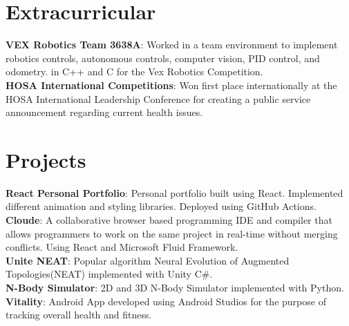 \documentclass[letterpaper,10pt]{article}
\begin{document}
\section{Extracurricular}
 \begin{itemize}[leftmargin=0.15in, label={}]
    \small{\item{
     \textbf{VEX Robotics Team 3638A}{: Worked in a team environment to implement robotics controls,
autonomous controls, computer vision, PID control, and odometry.
in C++ and C for the Vex Robotics Competition.} \\
     \textbf{HOSA International Competitions}{: Won first place internationally at the HOSA International Leadership Conference for creating a public service announcement regarding current health issues.} 

    }}

 \end{itemize}
\section{Projects}
 \begin{itemize}[leftmargin=0.15in, label={}]
    \small{\item{
    \textbf{React Personal Portfolio}{: Personal portfolio built using React. Implemented different animation and styling libraries. Deployed using GitHub Actions.} \\
     \textbf{Cloude}{: A collaborative browser based programming IDE and compiler that allows programmers to work on the same project in real-time without merging conflicts. Using React and Microsoft Fluid Framework.} \\
     
     \textbf{Unite NEAT}{: Popular algorithm Neural Evolution of Augmented Topologies(NEAT) implemented with Unity C\#.} \\
     \textbf{N-Body Simulator}{: 2D and 3D N-Body Simulator implemented with Python.} \\
     \textbf{Vitality}{: Android App developed using Android Studios for the purpose of tracking overall health and fitness.} 
        
    }}

 \end{itemize}
\end{document}
